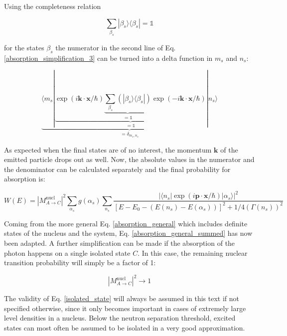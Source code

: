 \documentclass{article}
\begin{document}
Using the completeness relation

\begin{equation}
	\label{completeness_relation_system}
	\sum_{\beta_s} | \beta_s \rangle \langle \beta_s | = \mathbb{1}
\end{equation}

for the states $\beta_s$ the numerator in the second line of Eq. \ref{absorption_simplification_3} can be turned into a delta function in $m_s$ and $n_s$:

\begin{equation}
	\label{absorption_simplification_4}
	\underbrace{\langle m_s | \underbrace{\exp{\left( i \mathbf{k} \cdot \mathbf{x} / \hbar \right)} \underbrace{\sum_{\beta_s} \left( | \beta_s \rangle \langle \beta_s | \right)}_{ = \mathbb{1}} \exp{\left( - i \mathbf{k} \cdot \mathbf{x} / \hbar \right)} }_{ = \mathbb{1}} | n_s \rangle }_{ = \delta_{m_s, n_s}}
\end{equation}

As expected when the final states are of no interest, the momentum $\mathbf{k}$ of the emitted particle drops out as well. 
Now, the absolute values in the numerator and the denominator can be calculated separately and the final probability for absorption is:

\begin{equation}
\label{absorption_general_summed}
	W(E) = \left| M^{\mathrm{nucl}}_{A \to C} \right|^2 \sum_{\alpha_s} g(\alpha_s) \sum_{n_s} \frac{ \left| \langle n_s | \exp{\left( i \mathbf{p} \cdot \mathbf{x} / \hbar \right)} | \alpha_s \rangle \right|^2  }{\left[ E - E_0 - \left( E(n_s) - E(\alpha_s) \right) \right]^2 + 1/4 \left( \Gamma(n_s) \right)^2 }
\end{equation}

Coming from the more general Eq. \ref{absorption_general} which includes definite states of the nucleus and the system, Eq. \ref{absorption_general_summed} has now been adapted.
A further simplification can be made if the absorption of the photon happens on a single isolated state $C$.
In this case, the remaining nuclear transition probability will simply be a factor of 1:

\begin{equation}
	\label{isolated_state}
\left| M^{\mathrm{nucl}}_{A \to C} \right|^2 \to 1
\end{equation}

The validity of Eq. \ref{isolated_state} will always be assumed in this text if not specified otherwise, since it only becomes important in cases of extremely large level densities in a nucleus. Below the neutron separation threshold, excited states can most often be assumed to be isolated in a very good approximation.
\end{document}
